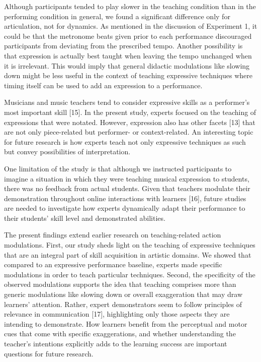 \documentclass[
  english,
  man,floatsintext]{apa6}
\begin{document}
Although participants tended to play slower in the teaching condition than in the performing condition in general, we found a significant difference only for articulation, not for dynamics. As mentioned in the discussion of Experiment 1, it could be that the metronome beats given prior to each performance discouraged participants from deviating from the prescribed tempo. Another possibility is that expression is actually best taught when leaving the tempo unchanged when it is irrelevant. This would imply that general didactic modulations like slowing down might be less useful in the context of teaching expressive techniques where timing itself can be used to add an expression to a performance.

Musicians and music teachers tend to consider expressive skills as a performer's most important skill {[}15{]}. In the present study, experts focused on the teaching of expressions that were notated. However, expression also has other facets {[}13{]} that are not only piece-related but performer- or context-related. An interesting topic for future research is how experts teach not only expressive techniques as such but convey possibilities of interpretation.

One limitation of the study is that although we instructed participants to imagine a situation in which they were teaching musical expression to students, there was no feedback from actual students. Given that teachers modulate their demonstration throughout online interactions with learners {[}16{]}, future studies are needed to investigate how experts dynamically adapt their performance to their students' skill level and demonstrated abilities.

The present findings extend earlier research on teaching-related action modulations. First, our study sheds light on the teaching of expressive techniques that are an integral part of skill acquisition in artistic domains. We showed that compared to an expressive performance baseline, experts made specific modulations in order to teach particular techniques. Second, the specificity of the observed modulations supports the idea that teaching comprises more than generic modulations like slowing down or overall exaggeration that may draw learners' attention. Rather, expert demonstrators seem to follow principles of relevance in communication {[}17{]}, highlighting only those aspects they are intending to demonstrate. How learners benefit from the perceptual and motor cues that come with specific exaggerations, and whether understanding the teacher's intentions explicitly adds to the learning success are important questions for future research.
\end{document}
